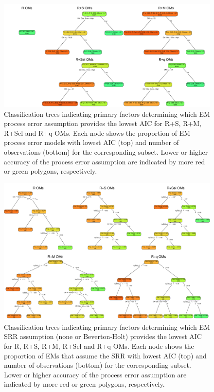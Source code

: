 \documentclass[
  12pt,
]{article}
\begin{document}
\begin{landscape}
\begin{figure}
\begin{center}
\includegraphics[width = 1.4\textwidth]{AIC_PE_classification_plots}
\end{center}
\caption{Classification trees indicating primary factors determining which EM process error assumption provides the lowest AIC for R+S, R+M, R+Sel and R+q OMs. Each node shows the proportion of EM process error models with lowest AIC (top) and number of observations (bottom) for the corresponding subset. Lower or higher accuracy of the process error assumption are indicated by more red or green polygons, respectively.}\label{AIC_PE_class}
\end{figure}
\end{landscape}

\begin{landscape}
\begin{figure}
\begin{center}
\includegraphics[width = 1.4\textwidth]{AIC_SRR_classification_plots}
\end{center}
\caption{Classification trees indicating primary factors determining which EM SRR assumption (none or Beverton-Holt) provides the lowest AIC for R, R+S, R+M, R+Sel and R+q OMs. Each node shows the proportion of EMs that assume the SRR with lowest AIC (top) and number of observations (bottom) for the corresponding subset. Lower or higher accuracy of the process error assumption are indicated by more red or green polygons, respectively.}\label{AIC_SRR_class}
\end{figure}
\end{landscape}
\end{document}
